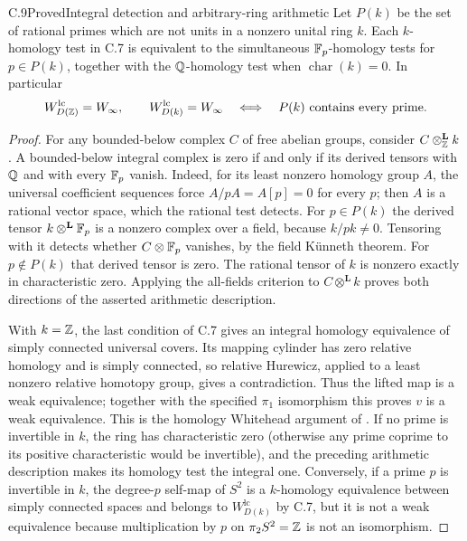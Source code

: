 \begin{claim}{C.9}{Proved}{Integral detection and arbitrary-ring arithmetic}
Let $P(k)$ be the set of rational primes which are not units in a nonzero unital ring $k$.  Each $k$-homology test in C.7 is equivalent to the simultaneous $\mathbb F_p$-homology tests for $p\in P(k)$, together with the $\mathbb Q$-homology test when $\operatorname{char}(k)=0$.  In particular
\[
 W_{D(\mathbb Z)}^{\mathrm{lc}}=W_\infty,
 \qquad
 W_{D(k)}^{\mathrm{lc}}=W_\infty
 \quad\Longleftrightarrow\quad P(k)\text{ contains every prime}.
\]
\end{claim}
\begin{proof}
For any bounded-below complex $C$ of free abelian groups, consider $C\otimes_{\mathbb Z}^{\mathbf L}k$.  A bounded-below integral complex is zero if and only if its derived tensors with $\mathbb Q$ and with every $\mathbb F_p$ vanish.  Indeed, for its least nonzero homology group $A$, the universal coefficient sequences force $A/pA=A[p]=0$ for every $p$; then $A$ is a rational vector space, which the rational test detects.  For $p\in P(k)$ the derived tensor $k\otimes^{\mathbf L}\mathbb F_p$ is a nonzero complex over a field, because $k/pk\ne0$.  Tensoring with it detects whether $C\otimes\mathbb F_p$ vanishes, by the field K\"unneth theorem.  For $p\notin P(k)$ that derived tensor is zero.  The rational tensor of $k$ is nonzero exactly in characteristic zero.  Applying the all-fields criterion to $C\otimes^{\mathbf L}k$ proves both directions of the asserted arithmetic description.

With $k=\mathbb Z$, the last condition of C.7 gives an integral homology equivalence of simply connected universal covers.  Its mapping cylinder has zero relative homology and is simply connected, so relative Hurewicz, applied to a least nonzero relative homotopy group, gives a contradiction.  Thus the lifted map is a weak equivalence; together with the specified $\pi_1$ isomorphism this proves $v$ is a weak equivalence.  This is the homology Whitehead argument of \citet[Corollary 4.33]{C_Hatcher2002}.  If no prime is invertible in $k$, the ring has characteristic zero (otherwise any prime coprime to its positive characteristic would be invertible), and the preceding arithmetic description makes its homology test the integral one.  Conversely, if a prime $p$ is invertible in $k$, the degree-$p$ self-map of $S^2$ is a $k$-homology equivalence between simply connected spaces and belongs to $W^{\mathrm{lc}}_{D(k)}$ by C.7, but it is not a weak equivalence because multiplication by $p$ on $\pi_2S^2=\mathbb Z$ is not an isomorphism.
\end{proof}

